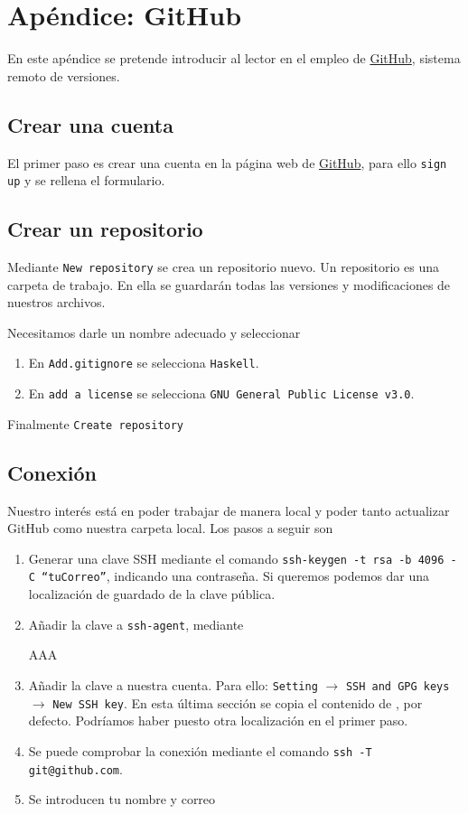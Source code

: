 \chapter{Apéndice: GitHub}
En este apéndice se pretende introducir al lector en
el empleo de \href{https://github.com/}{GitHub}, sistema remoto de versiones.
\section{Crear una cuenta}

El primer paso es crear una cuenta en la página web de \href{https://github.com/}{GitHub},
para ello \texttt{sign up} y se rellena el formulario.

\section{Crear un repositorio}

Mediante \texttt{New repository} se crea un repositorio nuevo.
Un repositorio es una carpeta de trabajo. En ella se guardarán todas
las versiones y modificaciones de nuestros archivos.

Necesitamos darle un nombre adecuado y seleccionar
\begin{enumerate}
\item En \texttt{Add.gitignore} se selecciona \texttt{Haskell}.
\item En \texttt{add a license} se selecciona \texttt{GNU General Public License v3.0}.
\end{enumerate}

Finalmente \texttt{Create repository}

\section{Conexión}

Nuestro interés está en poder trabajar de manera local y poder tanto actualizar
GitHub como nuestra carpeta local. Los pasos a seguir son
\begin{enumerate}
\item Generar una clave SSH mediante el comando
  \texttt{ssh-keygen -t rsa -b 4096 -C ``tuCorreo''}, indicando una contraseña.
  Si queremos podemos dar una localización de guardado de la clave pública.
\item Añadir la clave a \texttt{ssh-agent}, mediante
  
AAA
  
\item Añadir la clave a nuestra cuenta. Para ello: \texttt{Setting} $\rightarrow$
  \texttt{SSH and GPG keys} $\rightarrow$ \texttt{New SSH key}. En esta última
  sección se copia el contenido de , por defecto. Podríamos
  haber puesto otra localización en el primer paso.
\item Se puede comprobar la conexión mediante el comando \texttt{ssh -T git@github.com}.
\item Se introducen tu nombre y correo 
\end{enumerate}

